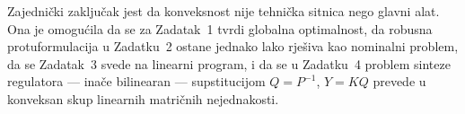 Zajednički zaključak jest da konveksnost nije tehnička sitnica nego glavni alat.
Ona je omogućila da se za Zadatak~1 tvrdi globalna optimalnost, da robusna
protuformulacija u Zadatku~2 ostane jednako lako rješiva kao nominalni problem,
da se Zadatak~3 svede na linearni program, i da se u Zadatku~4 problem sinteze
regulatora --- inače bilinearan --- supstitucijom $Q = P^{-1}$, $Y = KQ$ prevede
u konveksan skup linearnih matričnih nejednakosti.
